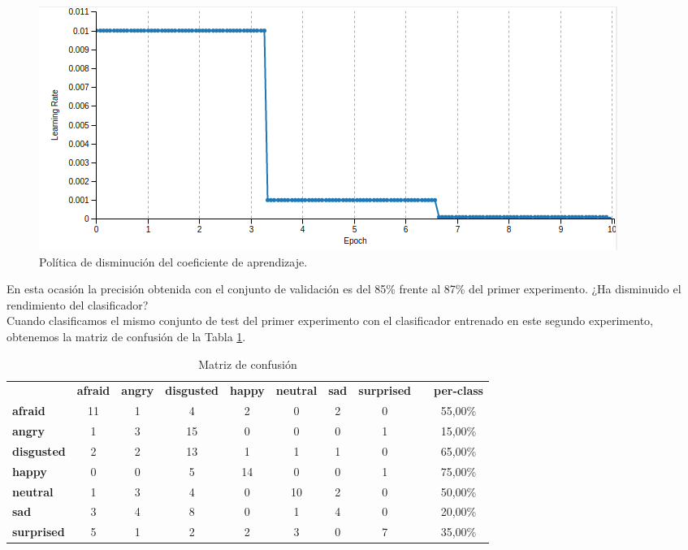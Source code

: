 \documentclass[a4paper,11pt]{book}
\begin{document}
\begin{figure}[h]
	\centering
	\includegraphics[width=0.9\linewidth]{imagenes/entrenamiento2results1}
	\caption[Resultados del entrenamiento 2]{Política de disminución del coeficiente de aprendizaje.}
	\label{fig:entrenamiento2results1}
\end{figure}

En esta ocasión la precisión obtenida con el conjunto de validación es del 85\% frente al 87\% del primer experimento. ¿Ha disminuido el rendimiento del clasificador?\\
Cuando clasificamos el mismo conjunto de test del primer experimento con el clasificador entrenado en este segundo experimento, obtenemos la matriz de confusión de la Tabla \ref{tab:entrenamiento2MC}.

\begin{table}[h]
	\centering
	\small
	\setlength\tabcolsep{3pt}
	\setlength\extrarowheight{2pt}
	\begin{tabular}{lccccccclc}
		& \multicolumn{1}{l}{\textbf{afraid}} & \multicolumn{1}{l}{\textbf{angry}} & \multicolumn{1}{l}{\textbf{disgusted}} & \multicolumn{1}{l}{\textbf{happy}} & \multicolumn{1}{l}{\textbf{neutral}} & \multicolumn{1}{l}{\textbf{sad}} & \multicolumn{1}{l}{\textbf{surprised}} &  & \multicolumn{1}{l}{\textbf{per-class}} \\
		\textbf{afraid}    & \cellcolor[HTML]{EFEFEF}11 & 1	& 4 & 2 & 0 & 2 & 0 &  & 55,00\% \\
		\textbf{angry}     & 1 & \cellcolor[HTML]{EFEFEF}3 & 15 & 0 & 0 & 0 & 1 &  & 15,00\% \\
		\textbf{disgusted} & 2 & 2 & \cellcolor[HTML]{EFEFEF}13 & 1 & 1 & 1 & 0 &  & 65,00\% \\
		\textbf{happy}     & 0 & 0 & 5 & \cellcolor[HTML]{EFEFEF}14 & 0 & 0 & 1 &  & 75,00\% \\
		\textbf{neutral}   & 1 & 3 & 4 & 0 & \cellcolor[HTML]{EFEFEF}10 & 2 & 0 &  & 50,00\% \\
		\textbf{sad}       & 3 & 4 & 8 & 0 & 1 & \cellcolor[HTML]{EFEFEF}4 & 0 &  & 20,00\% \\
		\textbf{surprised} & 5 & 1 & 2 & 2 & 3 & 0 & \cellcolor[HTML]{EFEFEF}7 &  & 35,00\%
	\end{tabular}
	\caption{Matriz de confusión}
	\label{tab:entrenamiento2MC}
\end{table}
\end{document}
